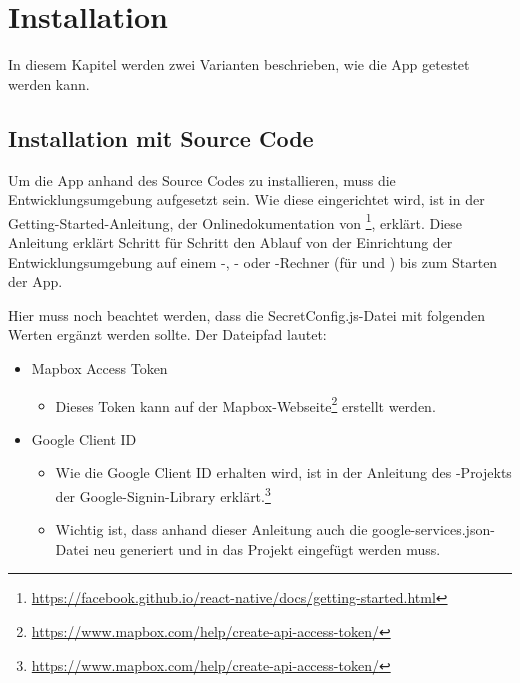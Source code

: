\chapter{Installation}
\label{pd-installation}

In diesem Kapitel werden zwei Varianten beschrieben, wie die App getestet werden kann. 


\section{Installation mit Source Code}
Um die App anhand des Source Codes zu installieren, muss die  Entwicklungsumgebung aufgesetzt sein. 
Wie diese eingerichtet wird, ist in der Getting-Started-Anleitung, der Onlinedokumentation von \footnote{\url{https://facebook.github.io/react-native/docs/getting-started.html}}, erklärt.
Diese Anleitung erklärt Schritt für Schritt den Ablauf von der Einrichtung der Entwicklungsumgebung auf einem -, - oder -Rechner (für  und ) bis zum Starten der App.

Hier muss noch beachtet werden, dass die SecretConfig.js-Datei mit folgenden Werten ergänzt werden sollte.
Der Dateipfad lautet: \newline

\begin{itemize}
	\item Mapbox Access Token
	\begin{itemize}
		\item Dieses Token kann auf der Mapbox-Webseite\footnote{\url{https://www.mapbox.com/help/create-api-access-token/}} erstellt werden.
	\end{itemize}
	
	\item Google Client ID 
	\begin{itemize}
		\item Wie die Google Client ID erhalten wird, ist in der Anleitung des -Projekts der Google-Signin-Library erklärt.\footnote{\url{https://www.mapbox.com/help/create-api-access-token/}}
		\item Wichtig ist, dass anhand dieser Anleitung auch die google-services.json-Datei neu generiert und in das Projekt eingefügt werden muss.
	\end{itemize}
\end{itemize}

